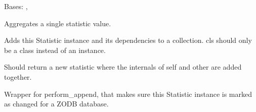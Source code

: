 \documentclass[letterpaper,10pt,english]{sphinxmanual}
\begin{document}
\begin{fulllineitems}
\label{\detokenize{pydash_app.dashboard.aggregator.statistics:pydash_app.dashboard.aggregator.statistics.Statistic}}
Bases: , 

Aggregates a single statistic value.

\begin{fulllineitems}
\label{\detokenize{pydash_app.dashboard.aggregator.statistics:pydash_app.dashboard.aggregator.statistics.Statistic.add_to_collection}}
Adds this Statistic instance and its dependencies to a collection.
cls should only be a class instead of an instance.

\end{fulllineitems}


\begin{fulllineitems}
\label{\detokenize{pydash_app.dashboard.aggregator.statistics:pydash_app.dashboard.aggregator.statistics.Statistic.add_together}}
Should return a new statistic where the internals of self and other are added together.

\end{fulllineitems}


\begin{fulllineitems}
\label{\detokenize{pydash_app.dashboard.aggregator.statistics:pydash_app.dashboard.aggregator.statistics.Statistic.append}}
Wrapper for perform\_append, that makes sure this Statistic instance is marked as changed for a ZODB database.


\end{fulllineitems}
\end{fulllineitems}
\end{document}
